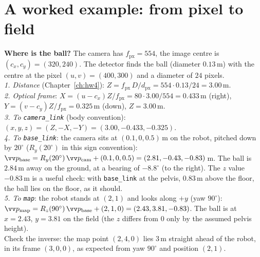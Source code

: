 \section*{A worked example: from pixel to field}
\begin{example}
\textbf{Where is the ball?} The camera has $f_\text{px}=554$, the image centre is $(c_x,c_y)=(320,240)$. The detector finds the ball (diameter $0.13$\,m) with the centre at the pixel $(u,v)=(400,300)$ and a diameter of $24$ pixels.\\
\emph{1. Distance} (Chapter~\ref{ch:hw4}): $Z=f_\text{px}\,D/d_\text{px}=554\cdot0.13/24=3.00$\,m.\\
\emph{2. Optical frame}: $X=(u-c_x)Z/f_\text{px}=80\cdot3.00/554=0.433$\,m (right), $Y=(v-c_y)Z/f_\text{px}=0.325$\,m (down), $Z=3.00$\,m.\\
\emph{3. To \verb!camera_link!} (body convention): $(x,y,z)=(Z,-X,-Y)=(3.00,-0.433,-0.325)$.\\
\emph{4. To \verb!base_link!}: the camera sits at $(0.1,0,0.5)$\,m on the robot, pitched down by $20^\circ$ ($R_y(20^\circ)$ in this sign convention): $\vv p_\text{base}=R_y(20^\circ)\,\vv p_\text{cam}+(0.1,0,0.5)=(2.81,-0.43,-0.83)$\,m. The ball is $2.84$\,m away on the ground, at a bearing of $-8.8^\circ$ (to the right). The $z$ value $-0.83$\,m is a useful check: with \verb!base_link! at the pelvis, $0.83$\,m above the floor, the ball lies on the floor, as it should.\\
\emph{5. To \verb!map!}: the robot stands at $(2,1)$ and looks along $+y$ (yaw $90^\circ$): $\vv p_\text{map}=R_z(90^\circ)\,\vv p_\text{base}+(2,1,0)=(2.43,3.81,-0.83)$. The ball is at $x=2.43$, $y=3.81$ on the field (the $z$ differs from $0$ only by the assumed pelvis height).\\
Check the inverse: the map point $(2,4,0)$ lies $3$\,m straight ahead of the robot, in its frame $(3,0,0)$, as expected from yaw $90^\circ$ and position $(2,1)$.
\end{example}
\begin{center}
\end{center}
